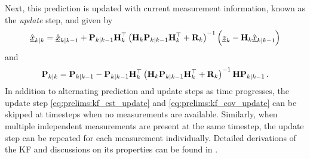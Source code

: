 Next, this prediction is updated with current measurement information, known as the \textit{update} step, and given by
\begin{equation}\label{eq:prelims:kf_est_update}
    \hat{{\underline{x}}}_{k|k} = \hat{{\underline{x}}}_{k|k-1}+{{\mathbf{P}}}_{k|k-1}{{\mathbf{H}}}_k^\top\left({{\mathbf{H}}}_k{{\mathbf{P}}}_{k|k-1}{{\mathbf{H}}}_k^\top + {{\mathbf{R}}}_k\right)^{-1}\left({\underline{z}}_k-{{\mathbf{H}}}_k\hat{{\underline{x}}}_{k|k-1}\right)
\end{equation}
and
\begin{equation}\label{eq:prelims:kf_cov_update}
    {\ensuremath{{\mathbf{P}}}}_{k|k} = {{\mathbf{P}}}_{k|k-1}-{{\mathbf{P}}}_{k|k-1}{{\mathbf{H}}}_k^\top\left({{\mathbf{H}}}_k{{\mathbf{P}}}_{k|k-1}{{\mathbf{H}}}_k^\top + {{\mathbf{R}}}_k\right)^{-1}{{\mathbf{H}}}{{\mathbf{P}}}_{k|k-1}\,.
\end{equation}
In addition to alternating prediction and update steps as time progresses, the update step \eqref{eq:prelims:kf_est_update} and \eqref{eq:prelims:kf_cov_update} can be skipped at timesteps when no measurements are available. Similarly, when multiple independent measurements are present at the same timestep, the update step can be repeated for each measurement individually. Detailed derivations of the KF and discussions on its properties can be found in \cite[Chap.~6]{haugBayesianEstimationTracking2012}.

% 
% 

